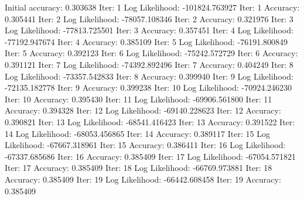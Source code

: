 \begin{python}

Initial accuracy: 0.303638
Iter: 1 Log Likelihood: -101824.763927
Iter: 1 Accuracy: 0.305441
Iter: 2 Log Likelihood: -78057.108346
Iter: 2 Accuracy: 0.321976
Iter: 3 Log Likelihood: -77813.725501
Iter: 3 Accuracy: 0.357451
Iter: 4 Log Likelihood: -77192.947674
Iter: 4 Accuracy: 0.385109
Iter: 5 Log Likelihood: -76191.800849
Iter: 5 Accuracy: 0.392123
Iter: 6 Log Likelihood: -75242.572729
Iter: 6 Accuracy: 0.391121
Iter: 7 Log Likelihood: -74392.892496
Iter: 7 Accuracy: 0.404249
Iter: 8 Log Likelihood: -73357.542833
Iter: 8 Accuracy: 0.399940
Iter: 9 Log Likelihood: -72135.182778
Iter: 9 Accuracy: 0.399238
Iter: 10 Log Likelihood: -70924.246230
Iter: 10 Accuracy: 0.395430
Iter: 11 Log Likelihood: -69906.561800
Iter: 11 Accuracy: 0.394328
Iter: 12 Log Likelihood: -69140.228623
Iter: 12 Accuracy: 0.390821
Iter: 13 Log Likelihood: -68541.416423
Iter: 13 Accuracy: 0.391522
Iter: 14 Log Likelihood: -68053.456865
Iter: 14 Accuracy: 0.389117
Iter: 15 Log Likelihood: -67667.318961
Iter: 15 Accuracy: 0.386411
Iter: 16 Log Likelihood: -67337.685686
Iter: 16 Accuracy: 0.385409
Iter: 17 Log Likelihood: -67054.571821
Iter: 17 Accuracy: 0.385409
Iter: 18 Log Likelihood: -66769.973881
Iter: 18 Accuracy: 0.385409
Iter: 19 Log Likelihood: -66442.608458
Iter: 19 Accuracy: 0.385409

\end{python}